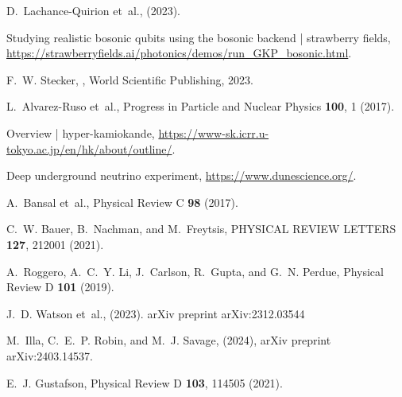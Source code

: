 \begin{thebibliography}{10}
    D.~Lachance-Quirion et~al.,
    \newblock (2023).
    
    Studying realistic bosonic qubits using the bosonic backend | strawberry
      fields,
    \newblock \url{https://strawberryfields.ai/photonics/demos/run_GKP_bosonic.html}.
    
    F.~W. Stecker,
    ,
    \newblock World Scientific Publishing, 2023.
    
    L.~Alvarez-Ruso et~al.,
    \newblock Progress in Particle and Nuclear Physics {\bf 100}, 1 (2017).
    
    Overview | hyper-kamiokande,
    \newblock \url{https://www-sk.icrr.u-tokyo.ac.jp/en/hk/about/outline/}.
    
    Deep underground neutrino experiment,
    \newblock \url{https://www.dunescience.org/}.
    
    A.~Bansal et~al.,
    \newblock Physical Review C {\bf 98} (2017).
    
    C.~W. Bauer, B.~Nachman, and M.~Freytsis,
    \newblock PHYSICAL REVIEW LETTERS {\bf 127}, 212001 (2021).
    
    A.~Roggero, A.~C.~Y. Li, J.~Carlson, R.~Gupta, and G.~N. Perdue,
    \newblock Physical Review D {\bf 101} (2019).
    
    J.~D. Watson et~al.,
    \newblock (2023).
    \newblock arXiv preprint arXiv:2312.03544
    
    M.~Illa, C.~E.~P. Robin, and M.~J. Savage,
    \newblock (2024),
    \newblock arXiv preprint arXiv:2403.14537.
    
    E.~J. Gustafson,
    \newblock Physical Review D {\bf 103}, 114505 (2021).
    
    \end{thebibliography}
    

